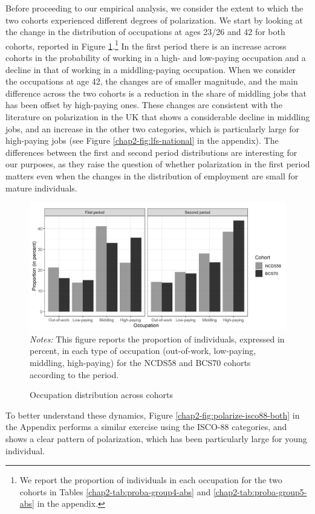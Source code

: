 Before proceeding to our empirical analysis, we consider the extent to which the two cohorts experienced different degrees of polarization. We start by looking at the change in the distribution of occupations at ages 23/26 and 42 for both cohorts, reported in Figure \ref{chap2-fig:stat-occ}.\footnote{We report the proportion of individuals in each occupation for the two cohorts in Tables \ref{chap2-tab:proba-group4-abs} and \ref{chap2-tab:proba-group5-abs} in the appendix.} In the first period there is an increase across cohorts in the probability of working in a high- and low-paying occupation and a decline in that of working in a middling-paying occupation. When we consider the occupations at age 42, the changes are of smaller magnitude, and the main difference across the two cohorts is a reduction in the share of middling jobs that has been offset by high-paying ones. These changes are consistent with the literature on polarization in the UK that shows a considerable decline in middling jobs, and an increase in the other two categories, which is particularly large for high-paying jobs (see Figure \ref{chap2-fig:lfs-national} in the appendix). The differences between the first and second period distributions are interesting for our purposes, as they raise the question of whether polarization in the first period matters even when the changes in the distribution of employment are small for mature individuals. 
\begin{figure}[!tb]
    \centering
    \caption{Occupation distribution across cohorts}
    \label{chap2-fig:stat-occ}
    \includegraphics[width=\linewidth]{chap2/graphic/stat-occ.png}
	\vspace{-3em}
	\justify\singlespacing\footnotesize{\textit{Notes:} This figure reports the proportion of individuals, expressed in percent, in each type of occupation (out-of-work, low-paying, middling, high-paying) for the NCDS58 and BCS70 cohorts according to the period.}
\end{figure}
To better understand these dynamics, Figure \ref{chap2-fig:polarize-isco88-both} in the Appendix performs a similar exercise using the ISCO-88 categories, and shows a clear pattern of polarization, which has been particularly large for young individual.


